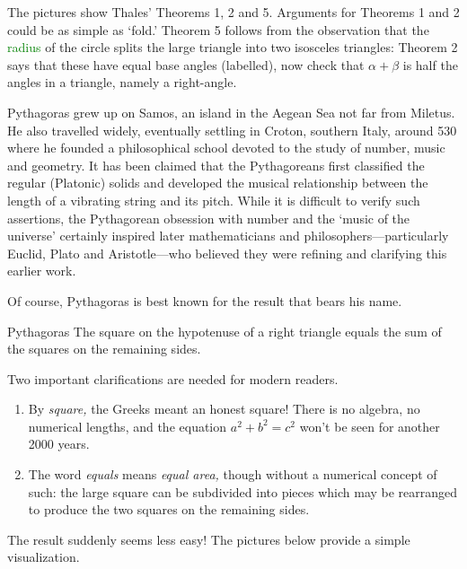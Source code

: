 The pictures show Thales' Theorems 1, 2 and 5. Arguments for Theorems 1 and 2 could be as simple as `fold.' Theorem 5 follows from the observation that the \textcolor{Green}{radius} of the circle splits the large triangle into two isosceles triangles: Theorem 2 says that these have equal base angles (labelled), now check that $\alpha+\beta$ is half the angles in a triangle, namely a right-angle.



Pythagoras grew up on Samos, an island in the Aegean Sea not far from Miletus. He also travelled widely, eventually settling in Croton, southern Italy, around 530\,\BC{} where he founded a philosophical school devoted to the study of number, music and geometry. It has been claimed that the Pythagoreans first classified the regular (Platonic) solids and developed the musical relationship between the length of a vibrating string and its pitch. While it is difficult to verify such assertions, the Pythagorean obsession with number and the `music of the universe' certainly inspired later mathematicians and philosophers---particularly Euclid, Plato and Aristotle---who believed they were refining and clarifying this earlier work.\smallbreak

Of course, Pythagoras is best known for the result that bears his name.

\begin{thm}{Pythagoras}{}
The square on the hypotenuse of a right triangle equals the sum of the squares on the remaining sides.
\end{thm}

Two important clarifications are needed for modern readers.
\begin{enumerate}\itemsep0pt
  \item By \emph{square,} the Greeks meant an honest square! There is no algebra, no numerical lengths, and the equation $a^2+b^2=c^2$ won't be seen for another 2000 years.
  \item The word \emph{equals} means \emph{equal area,} though without a numerical concept of such: the large square can be subdivided into pieces which may be rearranged to produce the two squares on the remaining sides.
\end{enumerate}

\goodbreak

The result suddenly seems less easy! The pictures below provide a simple visualization.

